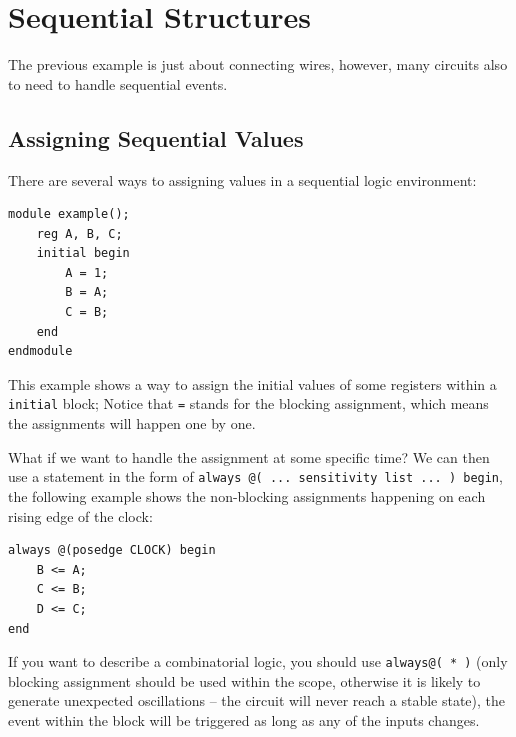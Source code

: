 \documentclass[a4paper,12pt, oneside]{book}
\begin{document}
\section{Sequential Structures}
The previous example is just about connecting wires, however, many circuits also to need to handle sequential events.
\subsection{Assigning Sequential Values}
There are several ways to assigning values in a sequential logic environment:
\begin{verbatim}
module example();
    reg A, B, C;
    initial begin
        A = 1;
        B = A;
        C = B;
    end
endmodule
\end{verbatim}
This example shows a way to assign the initial values of some registers within a \texttt{initial} block; Notice that \texttt{=} stands for the blocking assignment, which means the assignments will happen one by one.

What if we want to handle the assignment at some specific time? We can then use a statement in the form of \texttt{always @( ...  sensitivity  list  ... ) begin}, the following example shows the non-blocking assignments happening on each rising edge of the clock:
\begin{verbatim}
always @(posedge CLOCK) begin
    B <= A;
    C <= B;
    D <= C;
end
\end{verbatim}
If you want to describe a combinatorial logic, you should use \texttt{always@( * )} (only blocking assignment should be used within the scope, otherwise it is likely to generate unexpected oscillations -- the circuit will never reach a stable state), the event within the block will be triggered as long as any of the inputs changes.
\end{document}
